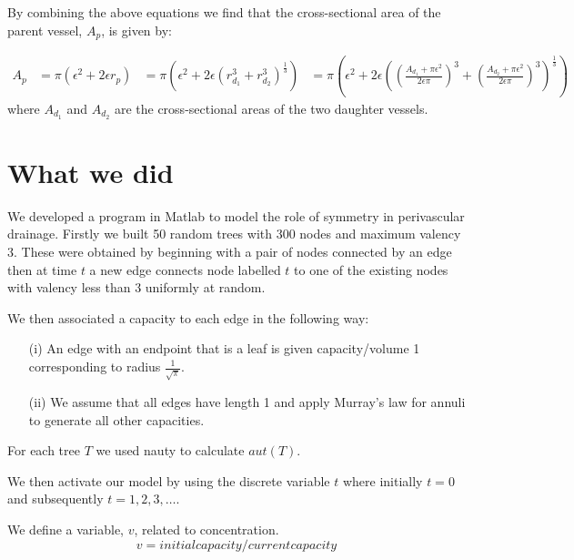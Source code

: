 \documentclass[12pt]{article} %
\theoremstyle{definition}
\begin{document}
By combining the above equations we find that the cross-sectional area of the parent
 vessel, $A_{p}$, is given by:

\begin{align}
A_{p} &= \pi(\epsilon^{2} + 2\epsilon r_{p})
&= \pi\left(\epsilon^{2} + 2\epsilon (r_{d_{1}}^{3} + r_{d_{2}}^{3})^{\frac{1}{3}}\right)
&= \pi\left(\epsilon^{2} + 2\epsilon \left(\left( \frac{A_{d_{1}} + \pi\epsilon^{2}}{2\epsilon\pi} \right)^{3} + \left( \frac{A_{d_{2}} + \pi\epsilon^{2}}{2\epsilon\pi} \right)^{3}\right)^{\frac{1}{3}}\right)
\end{align}
where $A_{d_{1}}$ and $A_{d_{2}}$ are the cross-sectional areas of the two daughter vessels.
\section{What we did}
We developed a program in Matlab \cite{} to model the role of symmetry in perivascular drainage. 
Firstly we built 50 random trees with 300 nodes and maximum valency 3.  These were obtained by beginning 
with a pair of nodes connected by an edge then at time $t$ a new edge connects node labelled $t$ to one of 
the existing %
nodes with valency less than 3 uniformly at random.  

We then associated a capacity to each edge in the following way:
\begin{itemize}

\item[(i)] An edge with an endpoint that is a leaf is given capacity/volume 1 corresponding to radius $\frac{1}{\sqrt{\pi}}$.

\item[(ii)] We assume that all edges have length 1 and apply Murray's law for annuli to generate all other 
capacities.


\end{itemize}
For each tree $T$ we used nauty \cite{nauty} to calculate $aut(T)$.

We then activate our model by using the discrete variable $t$ where initially $t = 0$ and subsequently $t =
1,2,3,\dots$.

We define a variable, $v$, related to concentration. %
\[v = initial capacity/current capacity\]
\end{document}
